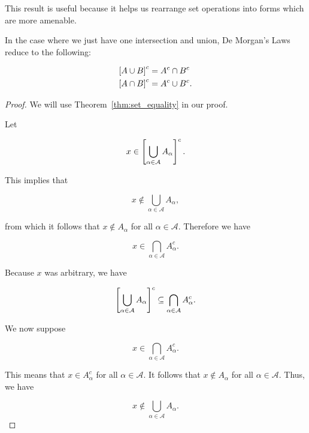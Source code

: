 \noindent
This result is useful because it helps us rearrange set operations
into forms which are more amenable.

In the case where we just have one intersection and union,
De Morgan's Laws reduce to the following:

\begin{align}
    \left[ A\cup B \right]^{c} &= A^{c} \cap B^{c} \nonumber\\
    \left[ A\cap B \right]^{c} &= A^{c} \cup B^{c}.
\end{align}

\begin{proof}
We will use Theorem~\ref{thm:set_equality} in our proof.

Let

\begin{equation}
    x\in \left[ \bigcup_{\alpha\in\mathcal{A}} A_{\alpha} \right]^{c}.
\end{equation}

\noindent
This implies that 

\begin{equation}
    x\notin \bigcup_{\alpha\in\mathcal{A}} A_{\alpha},
\end{equation}

\noindent
from which it follows that $x\notin A_{\alpha}$ for all $\alpha\in\mathcal{A}$.
Therefore we have

\begin{equation}
    x\in \bigcap_{\alpha\in\mathcal{A}} A_{\alpha}^{c}.
\end{equation}

\noindent
Because $x$ was arbitrary, we have

\begin{equation}
    \left[ \bigcup_{\alpha\in\mathcal{A}} A_{\alpha} \right]^{c}
        \subseteq \bigcap_{\alpha\in\mathcal{A}} A_{\alpha}^{c}.
    \label{eq:app_math_set_inequality_dml_1}
\end{equation}

We now suppose

\begin{equation}
    x\in\bigcap_{\alpha\in\mathcal{A}} A_{\alpha}^{c}.
\end{equation}

\noindent
This means that $x\in A_{\alpha}^{c}$ for all $\alpha\in\mathcal{A}$.
It follows that $x\notin A_{\alpha}$ for all $\alpha\in\mathcal{A}$.
Thus, we have

\begin{equation}
    x\notin\bigcup_{\alpha\in\mathcal{A}} A_{\alpha}.
\end{equation}


\end{proof}
